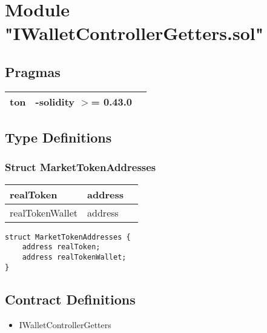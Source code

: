 
\section{Module "IWalletControllerGetters.sol"}


\subsection{Pragmas}


\noindent\begin{tabular}{|l|l|p{5cm}|}\hline
ton & -solidity $>$= 0.43.0 &\\\hline
\end{tabular}


\subsection{Type Definitions}


\subsubsection{Struct MarketTokenAddresses}


\ifsoltables
\noindent\begin{tabular}{|l|l|p{6cm}|}\hline
realToken & address & \\\hline
realTokenWallet & address & \\\hline
\end{tabular}
\fi


\begin{lstlisting}[firstnumber=3]
struct MarketTokenAddresses {
    address realToken;
    address realTokenWallet;
}
\end{lstlisting}

\subsection{Contract Definitions}

\begin{itemize}
\item IWalletControllerGetters
\end{itemize}
